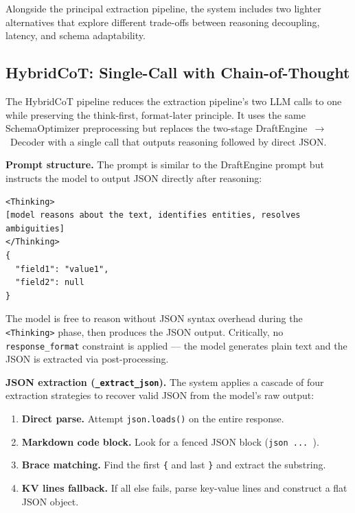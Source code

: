 \documentclass{ceurart}
\begin{document}
Alongside the principal extraction pipeline, the system includes two lighter
alternatives that explore different trade-offs between reasoning decoupling, latency,
and schema adaptability.

\subsection{HybridCoT: Single-Call with Chain-of-Thought}

The HybridCoT pipeline reduces the extraction pipeline's two LLM calls to one while
preserving the think-first, format-later principle.
It uses the same SchemaOptimizer preprocessing but replaces the two-stage
DraftEngine~$\to$~Decoder with a single call that outputs reasoning followed by
direct JSON.

\textbf{Prompt structure.}
The prompt is similar to the DraftEngine prompt but instructs the model to output JSON
directly after reasoning:

\begin{lstlisting}
<Thinking>
[model reasons about the text, identifies entities, resolves ambiguities]
</Thinking>
{
  "field1": "value1",
  "field2": null
}
\end{lstlisting}

The model is free to reason without JSON syntax overhead during the \texttt{<Thinking>}
phase, then produces the JSON output.
Critically, no \texttt{response\_format} constraint is applied --- the model generates
plain text and the JSON is extracted via post-processing.

\textbf{JSON extraction (\texttt{\_extract\_json}).}
The system applies a cascade of four extraction strategies to recover valid JSON from
the model's raw output:

\begin{enumerate}
\item \textbf{Direct parse.} Attempt \texttt{json.loads()} on the entire response.
\item \textbf{Markdown code block.} Look for a fenced JSON block
  (\texttt{\textasciigrave\textasciigrave\textasciigrave json ... \textasciigrave\textasciigrave\textasciigrave}).
\item \textbf{Brace matching.} Find the first \texttt{\{} and last \texttt{\}} and
  extract the substring.
\item \textbf{KV lines fallback.} If all else fails, parse key-value lines and
  construct a flat JSON object.
\end{enumerate}
\end{document}

